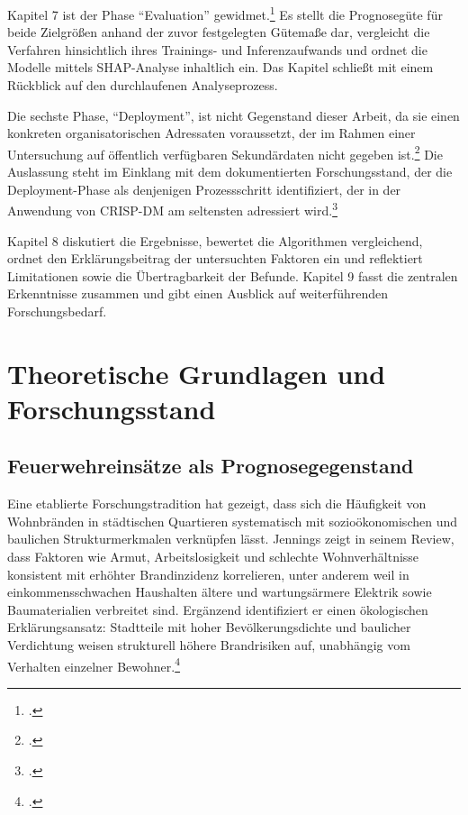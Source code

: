 \documentclass[12pt,a4paper]{article}
\begin{document}
Kapitel 7 ist der Phase \enquote{Evaluation} gewidmet.\footcite[??]{Wirth2000} Es stellt die
Prognosegüte für beide Zielgrößen anhand der zuvor festgelegten Gütemaße dar, vergleicht die
Verfahren hinsichtlich ihres Trainings- und Inferenzaufwands und ordnet die Modelle mittels
SHAP-Analyse inhaltlich ein. Das Kapitel schließt mit einem Rückblick auf den durchlaufenen
Analyseprozess.

Die sechste Phase, \enquote{Deployment}, ist nicht Gegenstand dieser Arbeit, da sie einen
konkreten organisatorischen Adressaten voraussetzt, der im Rahmen einer Untersuchung auf
öffentlich verfügbaren Sekundärdaten nicht gegeben ist.\footcite[??]{Wirth2000} Die Auslassung
steht im Einklang mit dem dokumentierten Forschungsstand, der die Deployment-Phase als denjenigen
Prozessschritt identifiziert, der in der Anwendung von CRISP-DM am seltensten adressiert
wird.\footcite[531--532]{Schroeer2021}

Kapitel 8 diskutiert die Ergebnisse, bewertet die Algorithmen vergleichend, ordnet den
Erklärungsbeitrag der untersuchten Faktoren ein und reflektiert Limitationen sowie die
Übertragbarkeit der Befunde. Kapitel 9 fasst die zentralen Erkenntnisse zusammen und gibt einen
Ausblick auf weiterführenden Forschungsbedarf.

\section{Theoretische Grundlagen und Forschungsstand}
\subsection{Feuerwehreinsätze als Prognosegegenstand}


Eine etablierte Forschungstradition hat gezeigt, dass sich die Häufigkeit von Wohnbränden in
städtischen Quartieren systematisch mit sozioökonomischen und baulichen Strukturmerkmalen
verknüpfen lässt. Jennings zeigt in seinem Review, dass Faktoren wie Armut, Arbeitslosigkeit und
schlechte Wohnverhältnisse konsistent mit erhöhter Brandinzidenz korrelieren, unter anderem weil
in einkommensschwachen Haushalten ältere und wartungsärmere Elektrik sowie Baumaterialien
verbreitet sind. Ergänzend identifiziert er einen ökologischen Erklärungsansatz: Stadtteile mit
hoher Bevölkerungsdichte und baulicher Verdichtung weisen strukturell höhere Brandrisiken auf,
unabhängig vom Verhalten einzelner Bewohner.\footcite[7-9]{Jennings1999}
\end{document}
